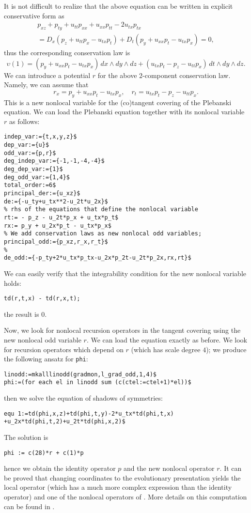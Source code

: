 It is not difficult to realize that the above equation can be written in
explicit conservative form as
\begin{multline*}
    p_{xz}+p_{ty}+u_{tt}p_{xx}+u_{xx}p_{tt}-2u_{tx}p_{tx} \\
    =D_x(p_z+u_{tt}p_x-u_{tx}p_t)+D_t(p_y+u_{xx}p_t-u_{tx}p_x)=0,
\end{multline*}
thus the corresponding conservation law is
\begin{equation}
  \label{eq:32}
  \upsilon(1)= (p_y+u_{xx}p_t-u_{tx}p_x)\,dx\wedge dy\wedge dz+
          (u_{tx}p_t-p_z-u_{tt}p_x)\,dt\wedge dy\wedge dz.
        \end{equation}
We can introduce a potential $r$ for the above $2$-component conservation
law. Namely, we can assume that
\begin{equation}\label{eq:101}
  r_x = p_y+u_{xx}p_t-u_{tx}p_x,\quad r_t = u_{tx}p_t-p_z-u_{tt}p_x.
\end{equation}
This is a new nonlocal variable for the (co)tangent covering of the Plebanski
equation. We can load the Plebanski equation together with its nonlocal
variable $r$ as follows:
\begin{verbatim}
indep_var:={t,x,y,z}$
dep_var:={u}$
odd_var:={p,r}$
deg_indep_var:={-1,-1,-4,-4}$
deg_dep_var:={1}$
deg_odd_var:={1,4}$
total_order:=6$
principal_der:={u_xz}$
de:={-u_ty+u_tx**2-u_2t*u_2x}$
% rhs of the equations that define the nonlocal variable
rt:= - p_z - u_2t*p_x + u_tx*p_t$
rx:= p_y + u_2x*p_t - u_tx*p_x$
% We add conservation laws as new nonlocal odd variables;
principal_odd:={p_xz,r_x,r_t}$
%
de_odd:={-p_ty+2*u_tx*p_tx-u_2x*p_2t-u_2t*p_2x,rx,rt}$
\end{verbatim}
We can easily verify that the integrability condition for the new nonlocal
variable holds:
\begin{verbatim}
td(r,t,x) - td(r,x,t);
\end{verbatim}
the result is $0$.

Now, we look for nonlocal recursion operators in the tangent covering using
the new nonlocal odd variable $r$. We can load the equation exactly as before.
We look for recursion operators which depend on $r$ (which has scale degree
$4$); we produce the following ansatz for \texttt{phi}:
\begin{verbatim}
linodd:=mkalllinodd(gradmon,l_grad_odd,1,4)$
phi:=(for each el in linodd sum (c(ctel:=ctel+1)*el))$
\end{verbatim}
then we solve the equation of shadows of symmetries:
\begin{verbatim}
equ 1:=td(phi,x,z)+td(phi,t,y)-2*u_tx*td(phi,t,x)
+u_2x*td(phi,t,2)+u_2t*td(phi,x,2)$
\end{verbatim}
The solution is
\begin{verbatim}
phi := c(28)*r + c(1)*p
\end{verbatim}
hence we obtain the identity operator $p$ and the new
nonlocal operator $r$. It can be proved that
changing coordinates to the evolutionary presentation yields the local operator
(which has a much more complex expression than the identity operator) and one
of the nonlocal operators of \cite{NeyziNutkuSheftel:JPA:2005}. More details on
this computation can be found in \cite{KrasilshchikVerbovetskyVitolo:SPT:2012}.
